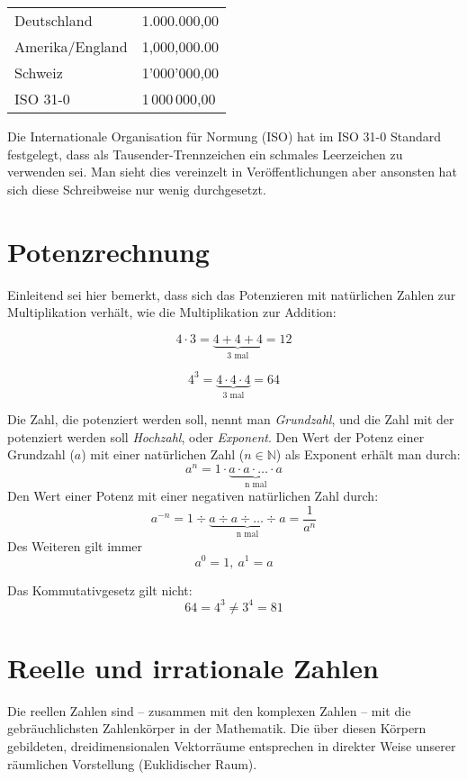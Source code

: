 \bigskip

\begin{tabular}{L{4cm}R{4cm}}
Deutschland & 1.000.000,00 \\
Amerika/England & 1,000,000.00 \\
Schweiz & 1'000'000,00 \\
ISO 31-0 & 1\,000\,000,00
\end{tabular}

\bigskip

Die Internationale Organisation für Normung (ISO) hat im ISO 31-0 Standard festgelegt, dass als Tausender-Trennzeichen ein schmales Leerzeichen zu verwenden sei. Man sieht dies vereinzelt in Veröffentlichungen aber ansonsten hat sich diese Schreibweise nur wenig durchgesetzt. 

\section{Potenzrechnung}

Einleitend sei hier bemerkt, dass sich das Potenzieren mit natürlichen Zahlen zur Multiplikation verhält, wie die Multiplikation zur Addition:

\[ 4\cdot 3 = \underbrace{4+4+4}_{\text{3 mal}} = 12 \]

\[ 4^3 = \underbrace{4\cdot 4\cdot 4}_{\text{3 mal}} = 64 \]

\begin{definition}
Die Zahl, die potenziert werden soll, nennt man \textsl{Grundzahl}, und die Zahl mit der potenziert werden soll \textsl{Hochzahl}, oder \textsl{Exponent}. Den Wert der Potenz einer Grundzahl ($a$) mit einer natürlichen Zahl ($n \in \mathbb{N}$) als Exponent erhält man durch:
\[ a^n = 1\cdot \underbrace{a\cdot a \cdot \dots \cdot a}_{\text{n mal}} \]
Den Wert einer Potenz mit einer negativen natürlichen Zahl durch:
\[ a^{-n} = 1 \div \underbrace{a\div a \div \dots \div a}_{\text{n mal}} = \frac{1}{a^n} \]
Des Weiteren gilt immer
\[ a^0 = 1,\ a^1=a \]
\end{definition}
Das Kommutativgesetz gilt nicht:
\[ 64 = 4^3 \ne 3^4 = 81 \]


\section{Reelle und irrationale Zahlen}\label{chap:realbegin}

Die reellen Zahlen sind -- zusammen mit den komplexen Zahlen -- mit die gebräuchlichsten Zahlenkörper in der Mathematik. Die über diesen Körpern gebildeten, dreidimensionalen Vektorräume entsprechen in direkter Weise unserer räumlichen Vorstellung (Euklidischer Raum). 


